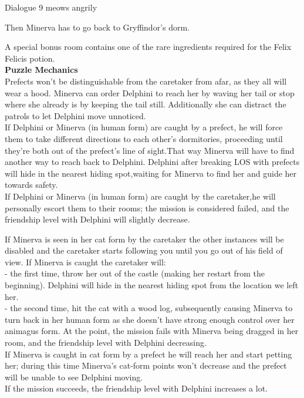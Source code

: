 \begin{dialogue}{Dialogue 9} 
	\*meows angrily\*
\end{dialogue} 

\pagebreak

Then Minerva has to go back to Gryffindor's dorm.

A special bonus room contains one of the rare ingredients required for the Felix Felicis potion.\\

\textbf{Puzzle Mechanics} \\

Prefects won't be distinguishable from the caretaker from afar, as they all will wear a hood. Minerva can order Delphini to reach her by waving her tail or stop where she already is by keeping the tail still. Additionally she can distract the patrols to let Delphini move unnoticed. \\

If Delphini or Minerva (in human form) are caught by a prefect, he will force them to take different directions to each other's dormitories, proceeding until they're both out of the prefect's line of sight.That way Minerva will have to find another way to reach back to Delphini. Delphini after breaking LOS with prefects will hide in the nearest hiding spot,waiting for Minerva to find her and guide her towards safety.\\

If Delphini or Minerva (in human form) are caught by the caretaker,he will personally escort them to their rooms; the mission is considered failed, and the friendship level with Delphini will slightly decrease.\\


If Minerva is seen in her cat form by the caretaker the other instances will be disabled and the caretaker starts following you until you go out of his field of view.
If Minerva is caught the caretaker will: \\

- the first time, throw her out of the castle (making her restart from the beginning). Delphini will hide in the nearest hiding spot from the location we left her.\\
- the second time, hit the cat with a wood log, subsequently causing Minerva to turn back in her human form as she doesn't have strong enough control over her animagus form. At the point, the mission fails with Minerva being dragged in her room, and the friendship level with Delphini decreasing.\\

If Minerva is caught in cat form by a prefect he will reach her and start petting her; during this time Minerva's cat-form points won't decrease and the prefect will be unable to see Delphini moving.\\

If the mission succeeds, the friendship level with Delphini increases a lot.
\pagebreak


